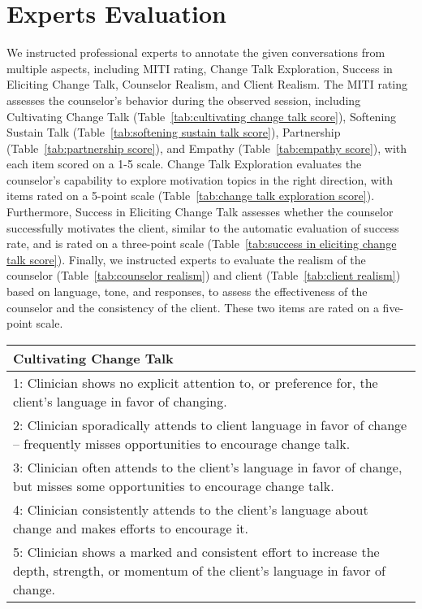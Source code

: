 \section{Experts Evaluation}
\label{app:expert evaluation}

We instructed professional experts to annotate the given conversations from multiple aspects, including MITI rating, Change Talk Exploration, Success in Eliciting Change Talk, Counselor Realism, and Client Realism. The MITI rating assesses the counselor's behavior during the observed session, including Cultivating Change Talk (Table~\ref{tab:cultivating change talk score}), Softening Sustain Talk (Table~\ref{tab:softening sustain talk score}), Partnership (Table~\ref{tab:partnership score}), and Empathy (Table~\ref{tab:empathy score}), with each item scored on a 1-5 scale. Change Talk Exploration evaluates the counselor's capability to explore motivation topics in the right direction, with items rated on a 5-point scale (Table~\ref{tab:change talk exploration score}). Furthermore, Success in Eliciting Change Talk assesses whether the counselor successfully motivates the client, similar to the automatic evaluation of success rate, and is rated on a three-point scale (Table~\ref{tab:success in eliciting change talk score}). Finally, we instructed experts to evaluate the realism of the counselor (Table~\ref{tab:counselor realism}) and client (Table~\ref{tab:client realism}) based on language, tone, and responses, to assess the effectiveness of the counselor and the consistency of the client. These two items are rated on a five-point scale.

\begin{table*}[tb]
\begin{tabularx}{\textwidth}{X}
\toprule
\textbf{Cultivating Change Talk} \\ \midrule
1: Clinician shows no explicit attention to, or preference for, the client’s language in favor of changing.                                                                                               \\
2: Clinician sporadically attends to client language in favor of change – frequently misses opportunities to encourage change talk.                                                                       \\
3: Clinician often attends to the client’s language in favor of change, but misses some opportunities to encourage change talk.                                                                           \\
4: Clinician consistently attends to the client’s language about change and makes efforts to encourage it.                                                                                                \\
5: Clinician shows a marked and consistent effort to increase the depth, strength, or momentum of the client’s language in favor of change.                                                               \\
\bottomrule                            
\end{tabularx}
\caption{Cultivating Change Talk Scores and Descriptions.}
\label{tab:cultivating change talk score}
\end{table*}

